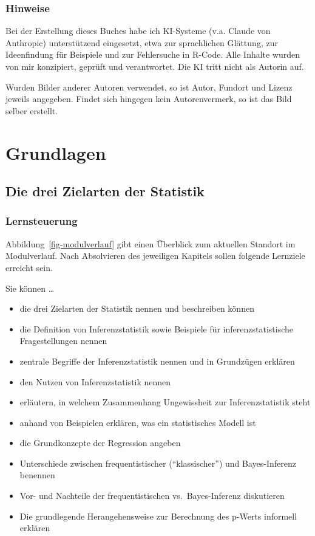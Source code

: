 \documentclass[
  ngerman,
  letterpaper,
  twoside,
  open=any]{scrbook}
\providecommand{\tightlist}{%
  \setlength{\itemsep}{0pt}\setlength{\parskip}{0pt}}\usepackage{longtable,booktabs,array}
\theoremstyle{definition}
\theoremstyle{plain}
\theoremstyle{definition}
\theoremstyle{definition}
\theoremstyle{remark}
\begin{document}
\section{Hinweise}\label{hinweise}

Bei der Erstellung dieses Buches habe ich KI-Systeme (v.a. Claude von
Anthropic) unterstützend eingesetzt, etwa zur sprachlichen Glättung, zur
Ideenfindung für Beispiele und zur Fehlersuche in R-Code. Alle Inhalte
wurden von mir konzipiert, geprüft und verantwortet. Die KI tritt nicht
als Autorin auf.

Wurden Bilder anderer Autoren verwendet, so ist Autor, Fundort und
Lizenz jeweils angegeben. Findet sich hingegen kein Autorenvermerk, so
ist das Bild selber erstellt.

\part{Grundlagen}

\chapter{Die drei Zielarten der
Statistik}\label{die-drei-zielarten-der-statistik}

\section{Lernsteuerung}\label{lernsteuerung}

Abbildung~\ref{fig-modulverlauf} gibt einen Überblick zum aktuellen
Standort im Modulverlauf. Nach Absolvieren des jeweiligen Kapitels
sollen folgende Lernziele erreicht sein.

Sie können \ldots{}

\begin{itemize}
\tightlist
\item
  die drei Zielarten der Statistik nennen und beschreiben können
\item
  die Definition von Inferenzstatistik sowie Beispiele für
  inferenzstatistische Fragestellungen nennen
\item
  zentrale Begriffe der Inferenzstatistik nennen und in Grundzügen
  erklären
\item
  den Nutzen von Inferenzstatistik nennen
\item
  erläutern, in welchem Zusammenhang Ungewissheit zur Inferenzstatistik
  steht
\item
  anhand von Beispielen erklären, was ein statistisches Modell ist
\item
  die Grundkonzepte der Regression angeben
\item
  Unterschiede zwischen frequentistischer (\enquote{klassischer}) und
  Bayes-Inferenz benennen
\item
  Vor- und Nachteile der frequentistischen vs.~Bayes-Inferenz
  diskutieren
\item
  Die grundlegende Herangehensweise zur Berechnung des p-Werts informell
  erklären
\end{itemize}
\end{document}
